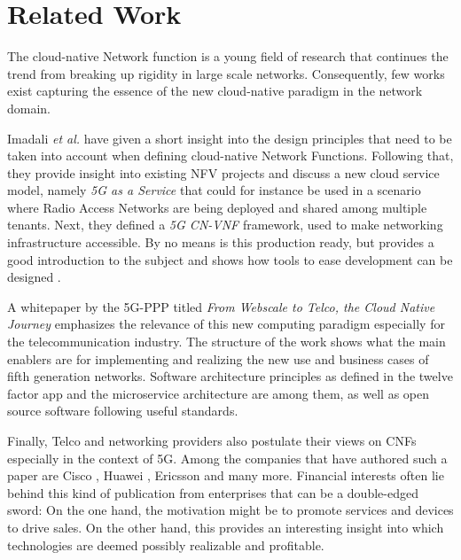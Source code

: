 \section{Related Work}
The cloud-native Network function is a young field of research that continues the trend from breaking up rigidity in large scale networks. Consequently, few works exist capturing the essence of the new cloud-native paradigm in the network domain.

Imadali \textit{et al.} have given a short insight into the design principles that need to be taken into account when defining cloud-native Network Functions. Following that, they provide insight into existing NFV projects and discuss a new cloud service model, namely \textit{5G as a Service} that could for instance be used in a scenario where Radio Access Networks are being deployed and shared among multiple tenants. Next, they defined a \textit{5G CN-VNF} framework, used to make networking infrastructure accessible. By no means is this production ready, but provides a good introduction to the subject and shows how tools to ease development can be designed \cite{cn5gvnf}.

A whitepaper by the 5G-PPP titled \textit{From Webscale to Telco, the Cloud Native Journey} \cite{5gppp} emphasizes the relevance of this new computing paradigm especially for the telecommunication industry. The structure of the work shows what the main enablers are for implementing and realizing the new use and business cases of fifth generation networks. Software architecture principles as defined in the twelve factor app and the microservice architecture are among them, as well as open source software following useful standards.

Finally, Telco and networking providers also postulate their views on CNFs especially in the context of 5G. Among the companies that have authored such a paper are Cisco \cite{CNF}, Huawei \cite{evolutionnfv}, Ericsson \cite{ericsson} and many more. Financial interests often lie behind this kind of publication from enterprises that can be a double-edged sword: On the one hand, the motivation might be to promote services and devices to drive sales. On the other hand, this provides an interesting insight into which technologies are deemed possibly realizable and profitable.